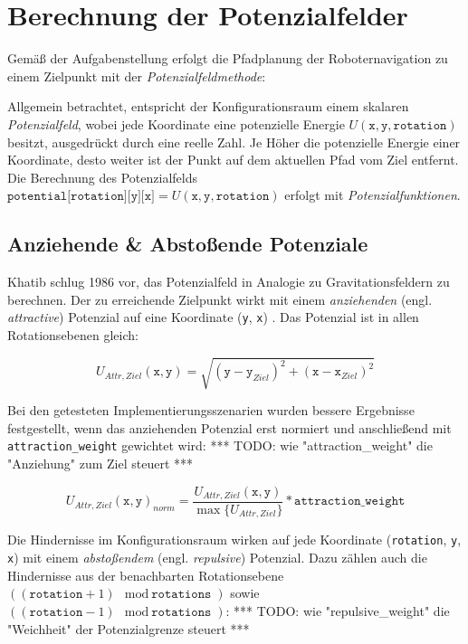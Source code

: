 \chapter{Berechnung der Potenzialfelder}

Gemäß der Aufgabenstellung erfolgt die Pfadplanung der Roboternavigation zu einem Zielpunkt mit der \textit{Potenzialfeldmethode}:

Allgemein betrachtet, entspricht der Konfigurationsraum einem skalaren \textit{Potenzialfeld}, wobei jede Koordinate eine potenzielle Energie $U(\texttt{x}, \texttt{y}, \texttt{rotation})$ besitzt, ausgedrückt durch eine reelle Zahl.
Je Höher die potenzielle Energie einer Koordinate, desto weiter ist der Punkt auf dem aktuellen Pfad vom Ziel entfernt.
\cite{yujiang.2017}
Die Berechnung des Potenzialfelds $\texttt{potential[rotation][y][x]} = U(\texttt{x}, \texttt{y}, \texttt{rotation})$ erfolgt mit \textit{Potenzialfunktionen}.

\section{Anziehende \& Abstoßende Potenziale}

Khatib schlug 1986 vor, das Potenzialfeld in Analogie zu Gravitationsfeldern zu berechnen. Der zu erreichende Zielpunkt wirkt mit einem \textit{anziehenden} (engl. \textit{attractive}) Potenzial auf eine Koordinate (\texttt{y}, \texttt{x}) \cite{khatib.1985}. Das Potenzial ist in allen Rotationsebenen gleich:

\begin{equation*}
U_{Attr, Ziel}(\texttt{x}, \texttt{y}) = \sqrt{(\texttt{y} - \texttt{y}_{Ziel})^2 + (\texttt{x} - \texttt{x}_{Ziel})^2}
\end{equation*}

Bei den getesteten Implementierungsszenarien wurden bessere Ergebnisse festgestellt, wenn das anziehenden Potenzial erst normiert und anschließend mit \texttt{attraction\_weight} gewichtet wird:
*** TODO: wie "attraction\_weight" die "Anziehung" zum Ziel steuert ***

\begin{equation*}
U_{Attr, Ziel}(\texttt{x}, \texttt{y})_{norm} = \frac{U_{Attr, Ziel}(\texttt{x}, \texttt{y})}{\max \{ U_{Attr, Ziel}\}} * \texttt{attraction\_weight}
\end{equation*}

Die Hindernisse im Konfigurationsraum wirken auf jede Koordinate (\texttt{rotation}, \texttt{y}, \texttt{x}) mit einem \textit{abstoßendem} (engl. \textit{repulsive}) Potenzial. Dazu zählen auch die Hindernisse aus der benachbarten Rotationsebene $((\texttt{rotation} + 1) \mod \texttt{rotations})$ sowie $((\texttt{rotation} - 1) \mod \texttt{rotations})$:
*** TODO: wie "repulsive\_weight" die "Weichheit" der Potenzialgrenze steuert ***

